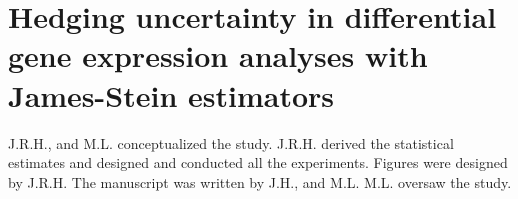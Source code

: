 \chapter{Hedging uncertainty in differential gene expression analyses with James-Stein estimators}
\label{chap:JS}

J.R.H., and M.L. conceptualized the study.
J.R.H. derived the statistical estimates and designed and conducted all the experiments.
Figures were designed by J.R.H.
The manuscript was written by J.H., and M.L.
M.L. oversaw the study.







